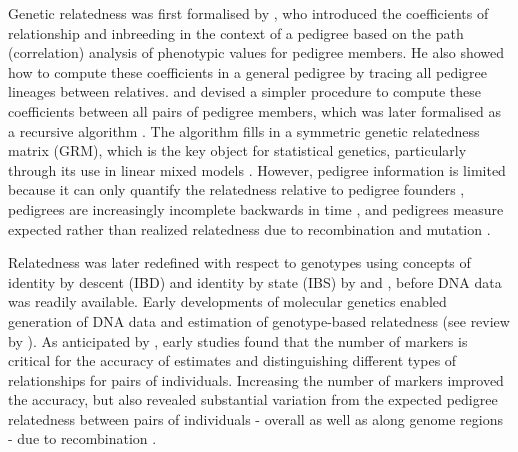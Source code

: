 \begin{tcolorbox}[breakable,pad at break*=1mm, colback=blue!5!white,colframe=blue!75!black,title=Box 1: A Brief History of Genetic Relatedness]


Genetic relatedness was first formalised by \cite{wright1922coefficients},
who introduced the coefficients of relationship and inbreeding in the
context of a pedigree based on the path (correlation) analysis of phenotypic
values for pedigree members.
%
He also showed how to compute these coefficients in a general pedigree by
tracing all pedigree lineages between relatives.
%
\cite{emik1949systematic} and \cite{cruden1949computation} devised a
simpler procedure to compute these coefficients between all pairs of
pedigree members, which was later formalised as a recursive algorithm
\citep{henderson1976simple}.
%
The algorithm fills in a symmetric genetic relatedness matrix (GRM), which is
the key object for statistical genetics, particularly through its use in
linear mixed models
\citep{falconer1996introduction, henderson1984applications,
lynch1998genetics, mrode2023linear}.
%
However, pedigree information is limited because
it can only quantify the relatedness relative to pedigree founders
\citep{wright1965interpretation, jacquard1975inbreeding},
pedigrees are increasingly incomplete backwards in time \citep[e.g.][]{legarra2015ancestral}, and
pedigrees measure expected rather than realized relatedness due to
recombination and mutation
\citep[e.g.][]{hill2011variation, thompson2013identity, garciacortes2013variance}.


Relatedness was later redefined with respect to genotypes using
concepts of identity by descent (IBD) and identity by state (IBS) by
\cite{cotterman1940calculus} and \cite{malecot1948mathematiques, malecot1969mathemathics},
before DNA data was readily available.
%
Early developments of molecular genetics enabled generation of DNA data
and estimation of genotype-based relatedness
(see review by \citet{weir2006genetic}).
%
As anticipated by \cite{thompson1975estimation}, early studies found that
the number of markers is critical for the accuracy of estimates
and distinguishing different types of relationships for pairs of individuals.
%
Increasing the number of markers improved the accuracy, but also
revealed substantial variation from the expected pedigree relatedness
between pairs of individuals - overall as well as along genome regions -
due to recombination \citep{weir2006genetic}.


\end{tcolorbox}
